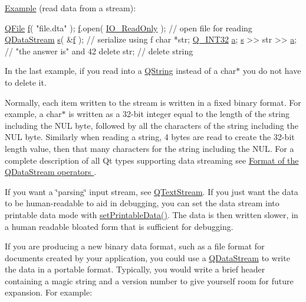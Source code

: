 \hyperlink{struct_example}{Example} (read data from a stream)\+: 
\begin{DoxyCode}
\hyperlink{class_q_file}{QFile} \hyperlink{namespaceversion_adc2f36e5bef89e3881981af504e0e31d}{f}( \textcolor{stringliteral}{"file.dta"} );
\hyperlink{namespaceversion_adc2f36e5bef89e3881981af504e0e31d}{f}.open( \hyperlink{qiodevice_8h_ab5766c5e147f3dfced5890741f22063a}{IO\_ReadOnly} );            \textcolor{comment}{// open file for reading}
\hyperlink{class_q_data_stream}{QDataStream} \hyperlink{058__bracket__recursion_8tcl_a011c73f2dbb87635a3b4206c72355f6e}{s}( &\hyperlink{namespaceversion_adc2f36e5bef89e3881981af504e0e31d}{f} );          \textcolor{comment}{// serialize using f}
\textcolor{keywordtype}{char}   *str;
\hyperlink{qglobal_8h_a7adc07f83f3448f63c6b02e33b573b06}{Q\_INT32} \hyperlink{058__bracket__recursion_8tcl_ab08ae027fc5777bc4f0629f1b60b35db}{a};
\hyperlink{058__bracket__recursion_8tcl_a011c73f2dbb87635a3b4206c72355f6e}{s} >> str >> \hyperlink{058__bracket__recursion_8tcl_ab08ae027fc5777bc4f0629f1b60b35db}{a};                \textcolor{comment}{// "the answer is" and 42}
\textcolor{keyword}{delete} str;                   \textcolor{comment}{// delete string}
\end{DoxyCode}


In the last example, if you read into a \hyperlink{class_q_string}{Q\+String} instead of a {\ttfamily char$\ast$} you do not have to delete it.

Normally, each item written to the stream is written in a fixed binary format. For example, a {\ttfamily char$\ast$} is written as a 32-\/bit integer equal to the length of the string including the N\+U\+L byte, followed by all the characters of the string including the N\+U\+L byte. Similarly when reading a string, 4 bytes are read to create the 32-\/bit length value, then that many characters for the string including the N\+U\+L. For a complete description of all Qt types supporting data streaming see \hyperlink{}{Format of the Q\+Data\+Stream operators } .

If you want a \char`\"{}parsing\char`\"{} input stream, see \hyperlink{class_q_text_stream}{Q\+Text\+Stream}. If you just want the data to be human-\/readable to aid in debugging, you can set the data stream into printable data mode with \hyperlink{class_q_data_stream_acc3df7d01950ab1a4673019f4f471e8d}{set\+Printable\+Data()}. The data is then written slower, in a human readable bloated form that is sufficient for debugging.

If you are producing a new binary data format, such as a file format for documents created by your application, you could use a \hyperlink{class_q_data_stream}{Q\+Data\+Stream} to write the data in a portable format. Typically, you would write a brief header containing a magic string and a version number to give yourself room for future expansion. For example\+:


